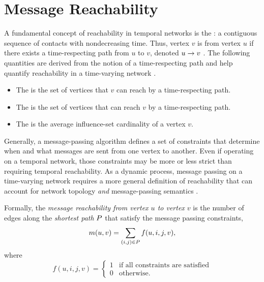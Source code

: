 \section{Message Reachability}\label{sec:reachability}
A fundamental concept of reachability in temporal networks is the : a contiguous sequence of contacts with nondecreasing time. Thus, vertex $v$ is  from vertex $u$ if there exists a time-respecting path from $u$ to $v$, denoted $u \rightarrow v$ \cite{Moody2002}. The following quantities are derived from the notion of a time-respecting path and help quantify reachability in a time-varying network \cite{Holme2012}.
%
\begin{itemize}
    \item The  is the set of vertices that $v$ can reach by a time-respecting path.
    \item The  is the set of vertices that can reach $v$ by a time-respecting path.
    \item The  is the average influence-set cardinality of a vertex $v$.
\end{itemize}

Generally, a message-passing algorithm defines a set of constraints that determine when and what messages are sent from one vertex to another. Even if operating on a temporal network, those constraints may be more or less strict than requiring temporal reachability. As a dynamic process, message passing on a time-varying network requires a more general definition of reachability that can account for network topology \emph{and} message-passing semantics \cite{Barrat2013}.

Formally, the \emph{message reachability from vertex $u$ to vertex $v$} is the number of edges along the \emph{shortest path} $P$ that satisfy the message passing constraints,
%
\begin{equation*}
	m(u, v) = \sum_{(i, j) \in P} f(u, i, j, v),
\end{equation*}
%
where
%
\begin{equation*}
    f(u, i, j, v) = 
        \begin{cases}
            1 & \text{if all constraints are satisfied} \\ 
            0 & \text{otherwise.}
        \end{cases}
\end{equation*}

